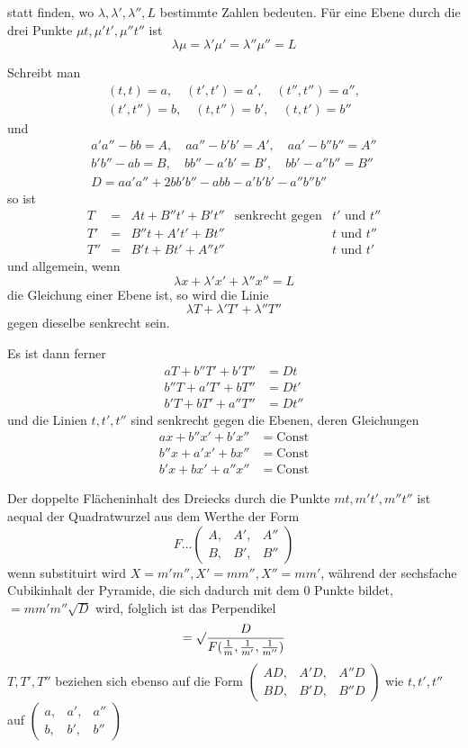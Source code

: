 %
statt finden, wo $\lambda,\lambda',\lambda'',L$ bestimmte Zahlen bedeuten. Für eine Ebene durch die drei Punkte $\mu t,\mu't',\mu''t''$ ist
\[
\lambda\mu=\lambda'\mu'=\lambda''\mu''=L
\]

Schreibt man
\[
\begin{gathered}
(t,t)=a,\quad(t',t')=a',\quad(t'',t'')=a'',\\
(t',t'')=b,\quad(t,t'')=b',\quad(t,t')=b''
\end{gathered}
\]
und
\[
\begin{gathered}
a'a''-bb=A,\quad aa''-b'b'=A',\quad aa'-b''b''=A''\\
b'b''-ab=B,\quad bb''-a'b'=B',\quad bb'-a''b''=B''\\
D=aa'a''+2bb'b''-abb-a'b'b'-a''b''b''
\end{gathered}
\]
so ist
\[
\begin{array}{rclll}
T&=&At+B''t'+B't''&\text{senkrecht gegen}&t'\text{ und }t''\\
T'&=&B''t+A't'+Bt''&&t\text{ und }t''\\
T''&=&B't+Bt'+A''t''&&t\text{ und }t'
\end{array}
\]
und allgemein, wenn
\[
\lambda x+\lambda'x'+\lambda''x''=L
\]
die Gleichung einer Ebene ist, so wird die Linie
\[
\lambda T+\lambda'T'+\lambda''T''
\]
gegen dieselbe senkrecht sein.

Es ist dann ferner
\[
\begin{aligned}
aT+b''T'+b'T''&=Dt\\
b''T+a'T'+bT''&=Dt'\\
b'T+bT'+a''T''&=Dt''
\end{aligned}
\]
und die Linien $t,t',t''$ sind senkrecht gegen die Ebenen, deren Gleichungen
\[
\begin{aligned}
ax+b''x'+b'x''&=\mathrm{Const}\\
b''x+a'x'+bx''&=\mathrm{Const}\\
b'x+bx'+a''x''&=\mathrm{Const}
\end{aligned}
\]

%
Der doppelte Flächeninhalt des Dreiecks durch die Punkte $mt,m't',m''t''$ ist aequal der Quadratwurzel aus dem Werthe der Form
\[
F\ldots\left(\begin{smallmatrix}A,&A',&A''\\B,&B',&B''\end{smallmatrix}\right)
\]
wenn substituirt wird $X=m'm'',X'=mm'',X''=mm'$, während der sechsfache Cubikinhalt der Pyramide, die sich dadurch mit dem $0$ Punkte bildet, $=mm'm''\surd D$ wird, folglich ist das Perpendikel
\[
=\surd\frac{D}{F(\frac1m,\frac1{m'},\frac1{m''})}
\]
$T,T',T''$ beziehen sich ebenso auf die Form $\left(\begin{smallmatrix}AD,&A'D,&A''D\\BD,&B'D,&B''D\end{smallmatrix}\right)$ wie $t,t',t''$ auf $\left(\begin{smallmatrix}a,&a',&a''\\b,&b',&b''\end{smallmatrix}\right)$

